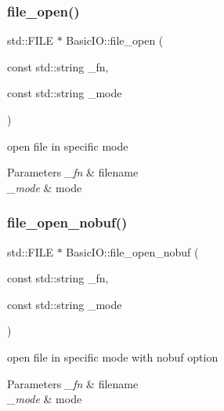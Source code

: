 \subsubsection{\texorpdfstring{file\+\_\+open()}{file\_open()}}
{\footnotesize\ttfamily std\+::\+F\+I\+LE $\ast$ Basic\+I\+O\+::file\+\_\+open (\begin{DoxyParamCaption}\item[{const std\+::string}]{\+\_\+fn,  }\item[{const std\+::string}]{\+\_\+mode }\end{DoxyParamCaption})\hspace{0.3cm}{\ttfamily [static]}}



open file in specific mode 


\begin{DoxyParams}{Parameters}
{\em \+\_\+fn} & filename \\
\hline
{\em \+\_\+mode} & mode \\
\hline
\end{DoxyParams}
\mbox{\label{class_basic_i_o_ad4ba62659302987f0bf22d5e4a705ab1}} 
\subsubsection{\texorpdfstring{file\+\_\+open\+\_\+nobuf()}{file\_open\_nobuf()}}
{\footnotesize\ttfamily std\+::\+F\+I\+LE $\ast$ Basic\+I\+O\+::file\+\_\+open\+\_\+nobuf (\begin{DoxyParamCaption}\item[{const std\+::string}]{\+\_\+fn,  }\item[{const std\+::string}]{\+\_\+mode }\end{DoxyParamCaption})\hspace{0.3cm}{\ttfamily [static]}}



open file in specific mode with nobuf option 


\begin{DoxyParams}{Parameters}
{\em \+\_\+fn} & filename \\
\hline
{\em \+\_\+mode} & mode \\
\hline
\end{DoxyParams}
\mbox{\label{class_basic_i_o_a6cafa2bbf504906e3484bd1c1df10474}} 
